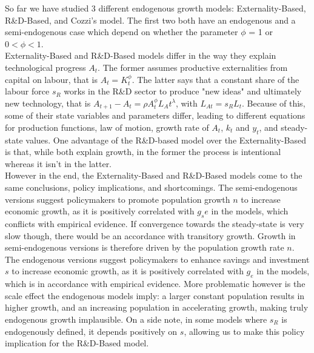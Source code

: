 \documentclass[11pt]{article} %
\begin{document}
So far we have studied 3 different endogenous growth models: Externality-Based, R\&D-Based, and Cozzi's model. The first two both have an endogenous and a semi-endogenous case which depend on whether the parameter $\phi$ = 1 or $0 < \phi < 1$.\\ Externality-Based and R\&D-Based models differ in the way they explain technological progress $A_t$. The former assumes productive externalities from capital on labour, that is $A_t = K_t^\phi$. The latter says that a constant share of the labour force $s_R$ works in the R\&D sector to produce "new ideas" and ultimately new technology, that is $A_{t+1} - A_t = \rho A_t^{\phi}L_At^\lambda$, with $L_{At} = s_{R}L_t$. Because of this, some of their state variables and parameters differ, leading to different equations for production functions, law of motion, growth rate of $A_t$, $k_t$ and $y_t$, and steady-state values. One advantage of the R\&D-based model over the Externality-Based is that, while both explain growth, in the former the process is intentional whereas it isn't in the latter.  \\
However in the end, the Externality-Based and R\&D-Based models come to the same conclusions, policy implications, and shortcomings. The semi-endogenous versions suggest policymakers to promote population growth $n$ to increase economic growth, as it is positively correlated with $g_se$ in the models, which conflicts with empirical evidence. If convergence towards the steady-state is very slow though, there would be an accordance with transitory growth. Growth in semi-endogenous versions is therefore driven by the population growth rate $n$. The endogenous versions suggest policymakers to enhance savings and investment $s$ to increase economic growth, as it is positively correlated with $g_e$ in the models, which is in accordance with empirical evidence. More problematic however is the scale effect the endogenous models imply: a larger constant population results in higher growth, and an increasing population in accelerating growth, making truly endogenous growth implausible. On a side note, in some models where $s_R$ is endogenously defined, it depends positively on $s$, allowing us to make this policy implication for the R\&D-Based model. 
\end{document}
